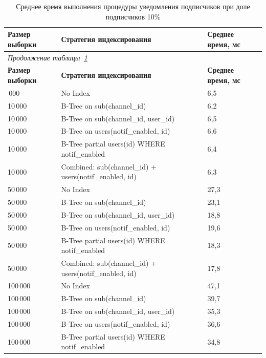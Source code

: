 \begin{longtable}{|p{2.4cm}|p{9.9cm}|p{2.3cm}|}
    \caption{Среднее время выполнения процедуры уведомления подписчиков при доле подписчиков 10\%}\label{tab:benchmark_avg_0_1} \\
    \hline
    \textbf{Размер выборки} & \textbf{Стратегия индексирования} & \textbf{Среднее время, мс} \\
    \hline
    \endfirsthead
    \multicolumn{3}{l}{\textit{Продолжение таблицы~\ref{tab:benchmark_avg_0_1}}} \\
    \hline
    \textbf{Размер выборки} & \textbf{Стратегия индексирования} & \textbf{Среднее время, мс} \\
    \hline
    \endhead
    \endfoot
    \endlastfoot
    10\,000 & No Index & 6,5 \\
    \hline
    10\,000 & B-Tree on sub(channel\_id) & 6,2 \\
    \hline
    10\,000 & B-Tree on sub(channel\_id, user\_id) & 6,5 \\
    \hline
    10\,000 & B-Tree on users(notif\_enabled, id) & 6,6 \\
    \hline
    10\,000 & B-Tree partial users(id) WHERE notif\_enabled & 6,4 \\
    \hline
    10\,000 & Combined: sub(channel\_id) + users(notif\_enabled, id) & 6,3 \\
    \hline
    50\,000 & No Index & 27,3 \\
    \hline
    50\,000 & B-Tree on sub(channel\_id) & 23,1 \\
    \hline
    50\,000 & B-Tree on sub(channel\_id, user\_id) & 18,8 \\
    \hline
    50\,000 & B-Tree on users(notif\_enabled, id) & 19,6 \\
    \hline
    50\,000 & B-Tree partial users(id) WHERE notif\_enabled & 18,3 \\
    \hline
    50\,000 & Combined: sub(channel\_id) + users(notif\_enabled, id) & 17,8 \\
    \hline
    100\,000 & No Index & 47,1 \\
    \hline
    100\,000 & B-Tree on sub(channel\_id) & 39,7 \\
    \hline
    100\,000 & B-Tree on sub(channel\_id, user\_id) & 35,3 \\
    \hline
    100\,000 & B-Tree on users(notif\_enabled, id) & 36,6 \\
    \hline
    100\,000 & B-Tree partial users(id) WHERE notif\_enabled & 34,8 \\
    \hline

\end{longtable}
